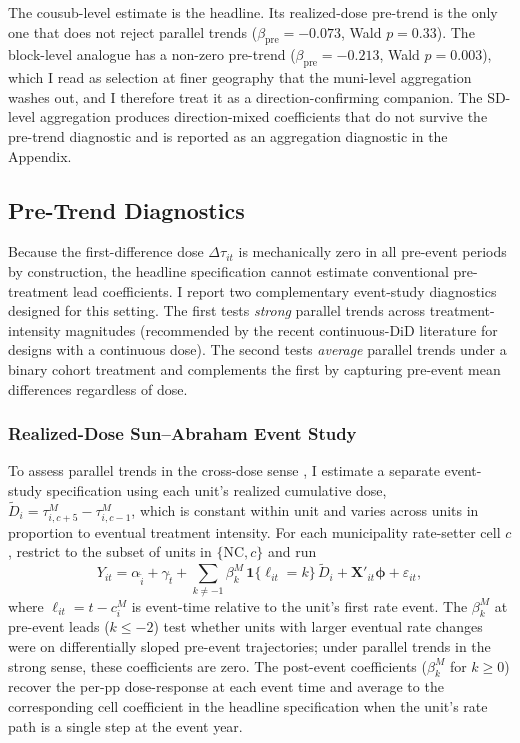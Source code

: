 \documentclass[12pt]{article}
\begin{document}
The cousub-level estimate is the headline. Its realized-dose pre-trend
is the only one that does not reject parallel trends ($\beta_{\text{pre}}
= -0.073$, Wald $p=0.33$). The block-level analogue has a non-zero
pre-trend ($\beta_{\text{pre}} = -0.213$, Wald $p=0.003$), which I read
as selection at finer geography that the muni-level aggregation washes
out, and I therefore treat it as a direction-confirming companion. The
SD-level aggregation produces direction-mixed coefficients that do not
survive the pre-trend diagnostic and is reported as an aggregation
diagnostic in the Appendix.

\subsection{Pre-Trend Diagnostics}
\label{subsec:pretrend-diagnostics}

Because the first-difference dose $\Delta\tau_{it}$ is mechanically
zero in all pre-event periods by construction, the headline
specification cannot estimate conventional pre-treatment lead
coefficients. I report two complementary event-study diagnostics
designed for this setting. The first tests \textit{strong} parallel
trends across treatment-intensity magnitudes (recommended by the
recent continuous-DiD literature for designs with a continuous dose).
The second tests \textit{average} parallel trends under a binary
cohort treatment and complements the first by capturing pre-event
mean differences regardless of dose.

\subsubsection{Realized-Dose Sun--Abraham Event Study}
\label{subsec:realized-dose-es}

To assess parallel trends in the cross-dose sense
\citep[][]{callaway2021,dechaisemartin2024}, I
estimate a separate event-study specification using each unit's
realized cumulative dose,
$\widetilde{D}_i = \tau^M_{i, c+5} - \tau^M_{i,c-1}$, which is
constant within unit and varies across units in proportion to
eventual treatment intensity. For each municipality rate-setter cell $c$, restrict
to the subset of units in $\{$NC$, c\}$ and run
\begin{equation}
Y_{it} = \alpha_{\tilde i} + \gamma_{\tilde t}
+ \sum_{k \neq -1} \beta^M_k\, \mathbf{1}\{\ell_{it} = k\}\,
\widetilde{D}_i
+ \mathbf{X}'_{it}\boldsymbol{\phi} + \varepsilon_{it},
\label{eq:realized-dose-es}
\end{equation}
where $\ell_{it} = t - c_i^M$ is event-time relative to the unit's
first rate event. The $\beta^M_k$ at pre-event leads ($k \leq -2$)
test whether units with larger eventual rate changes were on
differentially sloped pre-event trajectories; under parallel trends
in the strong sense, these coefficients are zero. The post-event
coefficients ($\beta^M_k$ for $k \geq 0$) recover the per-pp
dose-response at each event time and average to the corresponding
cell coefficient in the headline specification when the unit's rate
path is a single step at the event year.
\end{document}
